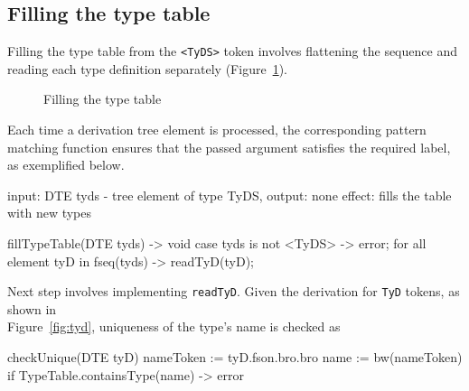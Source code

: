 \subsection{Filling the type table}\label{subsec:filling-the-type-table}
Filling the type table from the \verb+<TyDS>+ token involves flattening the sequence and reading each
type definition separately (Figure~\ref{fig:fill_tt}).
\begin{figure}[h]
    \centering
    \caption{Filling the type table}
    \label{fig:fill_tt}
\end{figure}
\newpage
Each time a derivation tree element is processed, the corresponding pattern matching function ensures
that the passed argument satisfies the required label, as exemplified below.
\begin{codeblock}[fillTypeTable]
    input: DTE tyds - tree element of type TyDS,
    output: none
    effect: fills the table with new types

    fillTypeTable(DTE tyds) -> void {
        case tyds is not <TyDS> -> error;
        for all element tyD in fseq(tyds) -> readTyD(tyD);
    }
\end{codeblock}
Next step involves implementing \verb+readTyD+.
Given the derivation for \verb+TyD+ tokens, as shown in\\ Figure~\ref{fig:tyd}, uniqueness of the type's name is checked as
\begin{codeblock}
    checkUnique(DTE tyD) {
        nameToken := tyD.fson.bro.bro
        name := bw(nameToken)
        if TypeTable.containsType(name) -> { error }
    }
\end{codeblock}
